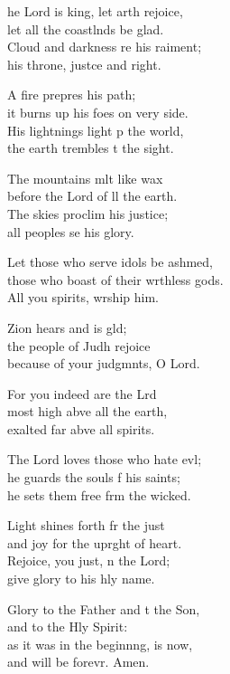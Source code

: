 \begin{psalmverse}
  \begin{patverse}
    he Lord is king, let arth rejoice,\Med\\
let all the coastlnds be glad.\\
Cloud and darkness re his raiment;\Med\\
his throne, just\pointup{\i}ce and right.

A fire prepres his path;\Med\\
it burns up his foes on very side.\\
His lightnings light p the world,\Med\\
the earth trembles t the sight.

The mountains mlt like wax\Med\\
before the Lord of ll the earth.\\
The skies proclim his justice;\Med\\
all peoples se his glory.

Let those who serve idols be ashmed,\Flex\\
those who boast of their wrthless gods.\Med\\
All you spirits, wrship him.

Zion hears and is gld;\Flex\\
the people of Judh rejoice\Med\\
because of your judgmnts, O Lord.

For you indeed are the Lrd\Flex\\
most high abve all the earth,\Med\\
exalted far abve all spirits.

The Lord loves those who hate ev\pointup{\i}l;\Flex\\
he guards the souls f his saints;\Med\\
he sets them free frm the wicked.

Light shines forth fr the just\Med\\
and joy for the upr\pointup{\i}ght of heart.\\
Rejoice, you just, \pointup{\i}n the Lord;\Med\\
give glory to his hly name.

Glory to the Father and t the Son,\Med\\
and to the Hly Spirit:\\
as it was in the beginn\pointup{\i}ng, is now,\Med\\
and will be forevr. Amen.
  \end{patverse}
\end{psalmverse}
